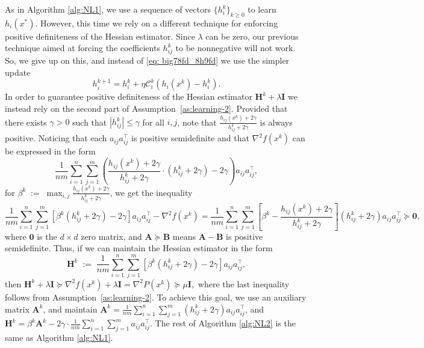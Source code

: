 \documentclass[12pt]{article}
\newcommand{\squeeze}{}
\newcommand{\eqdef}{\; { := }\;}
\newcommand{\newalpha}{h}
\newcommand{\mA}{\mathbf{A}}
\newcommand{\mB}{\mathbf{B}}
\newcommand{\mH}{\mathbf{H}}
\newcommand{\mI}{\mathbf{I}}
\newcommand{\cC}{{\mathcal{C}}}
\begin{document}
As in Algorithm \ref{alg:NL1}, we use a sequence of vectors $\{h_i^k\}_{k\geq 0}$ to learn $\newalpha_i(x^*)$. However, this 
time we rely on a different technique for enforcing positive definiteness of the Hessian estimator.  Since $\lambda$ can be zero, our previous technique aimed at forcing the coefficients $h_{ij}^k$ to be nonnegative will not work. So, we give up on this, 
and instead of \eqref{eq: big78fd_8h9fd} we use the simpler update 
\begin{equation}\label{eq:hikgeneral}
\boxed{\quad h^{k+1}_i = h^k_i + \eta \cC_i^k(\newalpha_i(x^k) - h^k_i). \quad}
\end{equation}
In order to guarantee positive definiteness of  the Hessian estimator $\mH^k + \lambda \mI$ we instead rely on the second part of Assumption~\ref{as:learning-2}. Provided that there exists $\gamma>0$ such that $|h_{ij}^k| \leq \gamma$ for all $i,j$, note that $\frac{\newalpha_{ij}(x^k) + 2\gamma}{h_{ij}^k + 2\gamma}$ is always positive. Noticing that each $a_{ij}a_{ij}^\top$ is positive semidefinite and that $\nabla^2 f(x^k)$ can be expressed in the form
$$
\squeeze \frac{1}{nm}\sum \limits_{i=1}^n \sum\limits_{j=1}^m \left( \frac{\newalpha_{ij}(x^k) + 2\gamma}{h_{ij}^k + 2\gamma} \cdot (h_{ij}^k + 2\gamma) - 2\gamma \right) a_{ij}a_{ij}^\top, 
$$
for  $\beta^k \eqdef \max_{i,j} \frac{\newalpha_{ij}(x^k) + 2\gamma}{h_{ij}^k + 2\gamma}$, we get the inequality
$$
 \frac{1}{nm}\sum_{i=1}^n \sum_{j=1}^m \left[ \beta^k (h_{ij}^k + 2\gamma) - 2\gamma \right] a_{ij}a_{ij}^\top - \nabla^2 f(x^k) 
= \frac{1}{nm}\sum_{i=1}^n \sum_{j=1}^m \left[  \beta^k - \frac{\newalpha_{ij}(x^k) + 2\gamma}{h_{ij}^k + 2\gamma} \right] (h_{ij}^k + 2\gamma) a_{ij}a_{ij}^\top 
\succeq \mathbf{0},
$$
where $\mathbf{0}$ is the $d\times d$ zero matrix, and $\mA \succeq \mB$ means $\mA - \mB$ is positive semidefinite. Thus, if we can maintain the Hessian estimator in the form $$\squeeze \mH^k \eqdef \frac{1}{nm}\sum \limits_{i=1}^n \sum \limits_{j=1}^m \left[ \beta^k (h_{ij}^k + 2\gamma) - 2\gamma \right] a_{ij}a_{ij}^\top,$$ then 
$
\mH^k + \lambda \mI \succeq \nabla^2 f(x^k) + \lambda \mI = \nabla^2P(x^k) \succeq \mu \mI,
$
where the last inequality follows from Assumption~\ref{as:learning-2}. To achieve this goal, we use an auxiliary matrix $\mA^k$, and maintain $\mA^k = \frac{1}{nm} \sum_{i=1}^n \sum_{j=1}^{m}(h_{ij}^k + 2\gamma) a_{ij}a_{ij}^\top$, and $\mH^k = \beta^k \mA^k - 2\gamma \cdot\frac{1}{nm} \sum_{i=1}^n  \sum_{j=1}^{m}a_{ij}a_{ij}^\top$. The rest of Algorithm \ref{alg:NL2} is the same as Algorithm \ref{alg:NL1}. 
\end{document}
